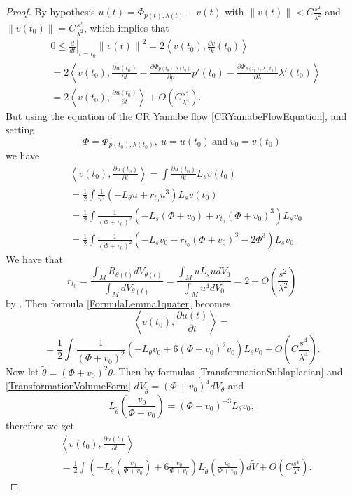 \documentclass[a4paper,12pt]{amsart}
\newcommand{\de}{\partial}
\newcommand{\N}[1]{\left\lVert#1\right\rVert}
\newcommand{\bra}{\left\langle}
\newcommand{\ket}{\right\rangle}
\begin{document}
\begin{proof}
 By hypothesis $u(t)=\Phi_{p(t),\lambda(t)}+v(t)$ with $\N{v(t)}<C\frac{s^2}{\lambda^2}$ and $\N{v(t_0)}=C\frac{s^2}{\lambda^2}$, which implies that
 \begin{align}
 \nonumber
 &0\le\left.\frac{d}{dt}\right|_{t=t_0}\N{v(t)}^2=2\bra v(t_0),\frac{\de v}{\de t}(t_0)\ket\\
 \nonumber
 &=2\bra v(t_0),\frac{\de u(t_0)}{\de t}-\frac{\de\Phi_{p(t_0),\lambda(t_0)}}{\de p}p'(t_0) -\frac{\de\Phi_{p(t_0),\lambda(t_0)}}{\de \lambda}\lambda'(t_0)\ket\\
\label{FormulaLemma1ter}
 &= 2\bra v(t_0),\frac{\de u(t_0)}{\de t}\ket + O\left(C\frac{s^4}{\lambda^4}\right).
 \end{align}
 But using the equation of the CR Yamabe flow \eqref{CRYamabeFlowEquation}, and setting \[\Phi=\Phi_{p(t_0),\lambda(t_0)},\ u=u(t_0)\ \mbox{and}\ v_0=v(t_0)\] we have 
 \begin{align}
 \nonumber
 &\bra v(t_0),\frac{\de u(t_0)}{\de t}\ket = \int \frac{\de u(t_0)}{\de t} L_sv(t_0)\\
 \nonumber
 &=\frac{1}{2}\int\frac{1}{u^2}\left(-L_{\theta}u +r_{t_0}u^3\right)L_sv(t_0)\\
 \nonumber
&=\frac{1}{2}\int\frac{1}{(\Phi+v_0)^2}\left(-L_s(\Phi+v_0) +r_{t_0}(\Phi+v_0)^3\right)L_sv_0\\
\label{FormulaLemma1quater}
 &=\frac{1}{2}\int\frac{1}{(\Phi+v_0)^2}\left(-L_sv_0 +r_{t_0}(\Phi+v_0)^3-2\Phi^3\right)L_sv_0
\end{align}
We have that
$$r_{t_0}=\frac{\int_MR_{\theta(t)}dV_{\theta(t)}}{\int_MdV_{\theta(t)}} = \frac{\int_MuL_sudV_0}{\int_Mu^4dV_0}=2+O\left(\frac{s^2}{\lambda^2}\right)$$
by \cite[Section B]{CMY2}. Then formula \eqref{FormulaLemma1quater} becomes
$$\bra v(t_0),\frac{\de u(t)}{\de t}\ket =$$
$$=\frac{1}{2}\int\frac{1}{(\Phi+v_0)^2}\left(-L_{\theta}v_0 +6(\Phi+v_0)^2v_0\right)L_{\theta}v_0 +O\left(C\frac{s^4}{\lambda^4}\right) .$$
Now let $\widetilde{\theta}=(\Phi+v_0)^2\theta$.
Then by formulas \eqref{TransformationSublaplacian} and \eqref{TransformationVolumeForm} $dV_{\widetilde{\theta}}=(\Phi+v_0)^4dV_{\theta}$ and
$$L_{\widetilde{\theta}}\left(\frac{v_0}{\Phi+v_0}\right)=(\Phi+v_0)^{-3}L_{\theta}v_0,$$
therefore we get
\begin{align}
\nonumber
&\bra v(t_0),\frac{\de u(t)}{\de t}\ket\\
\label{FormulaProofLemma1}
&=\frac{1}{2}\int\left(-L_{\widetilde{\theta}}\left(\frac{v_0}{\Phi+v_0}\right) +6\frac{v_0}{\Phi+v_0}\right)L_{\widetilde{\theta}}\left(\frac{v_0}{\Phi+v_0}\right)d\widetilde{V} +O\left(C\frac{s^4}{\lambda^4}\right).
\end{align}


\end{proof}
\end{document}
